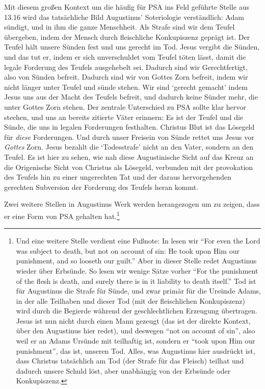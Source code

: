 Mit diesem großen Kontext um die häufig für PSA ins Feld geführte Stelle aus 13.16 wird das tatsächliche Bild Augustinus' Soteriologie verständlich:
Adam sündigt, und in ihm die ganze Menschheit. Als Strafe sind wir dem Teufel übergeben, indem der Mensch durch fleischliche Konkupiszenz geprägt ist.
Der Teufel hält unsere Sünden fest und uns gerecht im Tod.
Jesus vergibt die Sünden, und das tut er, indem er sich unverschuldet vom Teufel töten lässt, damit die legale Forderung des Teufels ausgehebelt sei.
Dadurch sind wir Gerechtfertigt, also von Sünden befreit. Dadurch sind wir von Gottes Zorn befreit, indem wir nicht länger unter Teufel und sünde stehen.
Wir sind `gerecht gemacht' indem Jesus uns aus der Macht des Teufels befreit, und dadurch keine Sünder mehr, die unter Gottes Zorn stehen.
Der zentrale Unterschied zu PSA sollte klar hervor stechen, und uns an bereits zitierte Väter erinnern:
Es ist der Teufel und die Sünde, die uns in legalen Forderungen festhalten.
Christus Blut ist das Lösegeld für \textit{diese} Forderungen. Und durch unser Freisein von Sünde rettet uns Jesus vor \textit{Gottes} Zorn.
Jesus bezahlt die `Todesstrafe' nicht an den Vater, sondern an den Teufel.
Es ist hier zu sehen, wie nah diese Augustinische Sicht auf das Kreuz an die Origenische Sicht von Christus als Lösegeld, verbunden mit der provokation des Teufels hin zu
einer ungerechten Tat und der daraus hervorgehenden gerechten Subversion der Forderung des Teufels heran kommt.

Zwei weitere Stellen in Augustinus Werk werden herangezogen um zu zeigen, dass er eine Form von PSA gehalten hat.\footnote{
	Und eine weitere Stelle verdient eine Fußnote:
	In \Cite[10]{enerationes-in-psalmos} lesen wir
	``For even the Lord was subject to death, but not on account of sin:
	He took upon Him our punishment, and so looseth our guilt.''
	Aber in dieser Stelle redet Augustinus wieder über Erbsünde. So lesen wir wenige Sätze vorher
	``For the punishment of the flesh is death, and surely there is in it liability to death itself.''
	Tod ist für Augustinus die Strafe für Sünde, und zwar primär für die Ursünde Adams, in der alle Teilhaben und dieser Tod
	(mit der fleischlichen Konkupiszenz) wird durch
	die Begierde während der geschlechtlichen Erzeugung übertragen.
	Jesus ist nun nicht durch einen Mann gezeugt (das ist der direkte Kontext, über den Augustinus hier redet),
	und deswegen ``not on account of sin'', also weil er an Adams Ursünde mit teilhaftig ist,
	sondern er ``took upon Him our punishment'', das ist, unseren Tod.
	Alles, was Augustinus hier ausdrückt ist, dass Christus tatsächlich am Tod (der Strafe für das Fleisch) teilhat und dadurch unsere Schuld löst, aber unabhängig von der Erbsünde oder Konkupiszenz.
}


